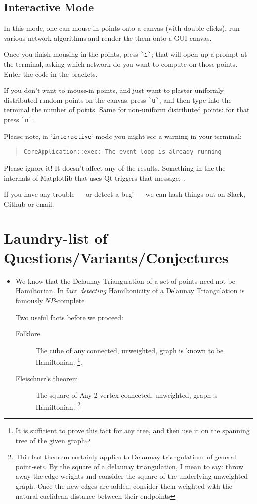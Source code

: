 \begin{appendices}
\subsection{Interactive Mode}

In this mode, one can mouse-in points onto a canvas (with double-clicks), run various network algorithms 
and render the them onto a GUI canvas. 

Once you finish mousing in the points, press \verb|`i`|; that will open up a prompt at the terminal, asking which 
network do you want to compute on those points. Enter the code in the brackets. 

If you don't want to mouse-in points, and just want to plaster uniformly distributed random points on the canvas, 
press \verb|`u`|, and then type into the terminal the number of points. Same for non-uniform distributed points: for that
press \verb|`n`|. 

Please note, in `\verb|interactive|` mode you might see a
warning in your terminal:

\begin{quote}
\color{blue}
\verb|CoreApplication::exec: The event loop is already running|
\end{quote}

Please ignore it! It doesn't affect any of the results. Something in the
the internals of Matplotlib that uses Qt triggers that message. \shrug. 

If you have any trouble --- or detect a bug! ---  we can hash things out on Slack, Github or email.

\section{Laundry-list of Questions/Variants/Conjectures}
 \label{sec:questions}

\begin{itemize}
\item We know that the Delaunay Triangulation of a set of points need not be Hamiltonian. In fact \textit{detecting}
      Hamiltonicity of a Delaunay Triangulation is famously $NP$-complete \cite{dillencourt1996finding} 

      Two useful facts before we proceed: 

     \begin{description}
       \item[Folklore] The cube of any connected, unweighted, graph is known to be Hamiltonian. 
             \footnote{It is sufficient to prove this fact for any tree, and then use it on the spanning tree of the given graph}. 
       \item[Fleischner's theorem  \cite{georgakopoulos2009short}] The square of 
             Any 2-vertex connected, unweighted, graph is Hamiltonian. \footnote{This last theorem certainly applies to Delaunay triangulations of general point-sets.  By the square of a delaunay triangulation, I mean to say: throw away the edge weights and consider the square of the underlying unweighted graph. Once the new edges are added, consider them weighted with the natural euclidean distance between their endpoints}
     \end{description}


\end{itemize}
\end{appendices}
